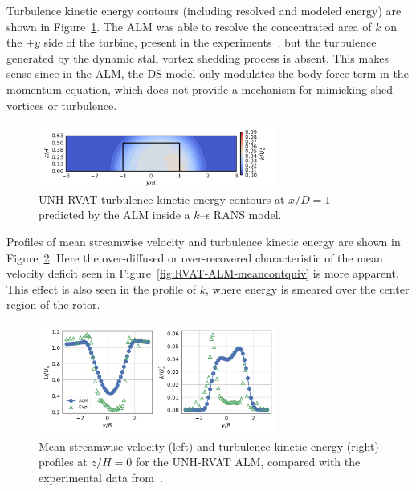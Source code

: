 \documentclass[times]{weauth}
\begin{document}
Turbulence kinetic energy contours (including resolved and modeled energy) are
shown in Figure~\ref{fig:RVAT-ALM-kcont}. The ALM was able to resolve the
concentrated area of $k$ on the $+y$ side of the turbine, present in the
experiments~\cite{Bachant2015-JoT}, but the turbulence generated by the dynamic
stall vortex shedding process is absent. This makes sense since in the ALM, the
DS model only modulates the body force term in the momentum equation, which does
not provide a mechanism for mimicking shed vortices or turbulence.

\begin{figure}
    \centering

    \includegraphics[width=0.7\textwidth]{RVAT-ALM_kcont}

    \caption{UNH-RVAT turbulence kinetic energy contours at $x/D=1$ predicted by
        the ALM inside a $k$--$\epsilon$ RANS model.}

    \label{fig:RVAT-ALM-kcont}
\end{figure}

Profiles of mean streamwise velocity and turbulence kinetic energy are shown in
Figure~\ref{fig:RVAT-ALM-profiles}. Here the over-diffused or over-recovered
characteristic of the mean velocity deficit seen in
Figure~\ref{fig:RVAT-ALM-meancontquiv} is more apparent. This effect is also
seen in the profile of $k$, where energy is smeared over the center region of
the rotor.

\begin{figure}
    \centering

    \includegraphics[width=0.7\textwidth]{RVAT-ALM_wake-profiles}

    \caption{Mean streamwise velocity (left) and turbulence kinetic energy
        (right) profiles at $z/H=0$ for the UNH-RVAT ALM, compared with the
        experimental data from~\cite{Bachant2016-RVAT-Re-dep}.}

    \label{fig:RVAT-ALM-profiles}
\end{figure}
\end{document}
